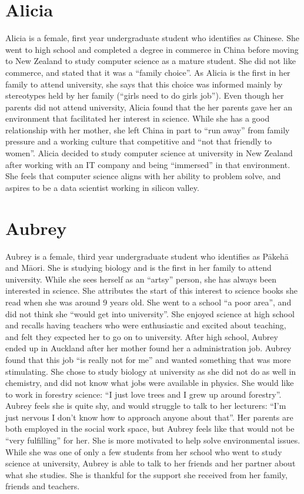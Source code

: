 \section*{Alicia}
Alicia is a female, first year undergraduate student who identifies as Chinese. She went to high school and completed a degree in commerce in China before moving to New Zealand to study computer science as a mature student. She did not like commerce, and stated that it was a ``family choice''. As Alicia is the first in her family to attend university, she says that this choice was informed mainly by stereotypes held by her family (``girls need to do girls job''). Even though her parents did not attend university, Alicia found that the her parents gave her an environment that facilitated her interest in science. While she has a good relationship with her mother, she left China in part to ``run away'' from family pressure and a working culture that competitive and ``not that friendly to women''. Alicia decided to study computer science at university in New Zealand after working with an IT company and being ``immersed'' in that environment. She feels that computer science aligns with her ability to problem solve, and aspires to be a data scientist working in silicon valley.


\section*{Aubrey}
Aubrey is a female, third year undergraduate student who identifies as P\={a}keh\={a} and M\={a}ori. She is studying biology and is the first in her family to attend university. While she sees herself as an ``artsy'' person, she has always been interested in science. She attributes the start of this interest to science books she read when she was around 9 years old. She went to a school ``a poor area'', and did not think she ``would get into university''. She enjoyed science at high school and recalls having teachers who were enthusiastic and excited about teaching, and felt they expected her to go on to university. After high school, Aubrey ended up in Auckland after her mother found her a administration job. Aubrey found that this job ``is really not for me'' and wanted something that was more stimulating. She chose to study biology at university as she did not do as well in chemistry, and did not know what jobs were available in physics. She would like to work in forestry science: ``I just love trees and I grew up around forestry''. Aubrey feels she is quite shy, and would struggle to talk to her lecturers: ``I’m just nervous I don’t know how to approach anyone about that''. Her parents are both employed in the social work space, but Aubrey feels like that would not be ``very fulfilling'' for her. She is more motivated to help solve environmental issues. While she was one of only a few students from her school who went to study science at university, Aubrey is able to talk to her friends and her partner about what she studies. She is thankful for the support she received from her family, friends and teachers. 


